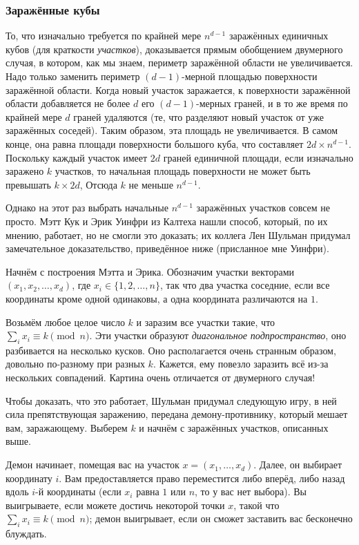 \subsubsection*{Заражённые кубы}

То, что изначально требуется по крайней мере $n^{d-1}$ заражённых единичных кубов (для краткости \emph{участков}), доказывается прямым обобщением двумерного случая, в котором, как мы знаем, периметр заражённой области не увеличивается.
Надо только заменить периметр $(d-1)$-мерной площадью поверхности заражённой области.
Когда новый участок заражается, к поверхности заражённой области добавляется не более $d$ его $(d-1)$-мерных граней,
и в то же время по крайней мере $d$ граней удаляются (те, что разделяют новый участок от уже заражённых соседей).
Таким образом, эта площадь не увеличивается.
В самом конце, она равна площади поверхности большого куба, что составляет $2d \times n^{d-1}$.
Поскольку каждый участок имеет $2d$ граней единичной площади,
если изначально заражено $k$ участков, то начальная площадь поверхности не может быть превышать $k \times 2d$, 
Отсюда $k$ не меньше $n^{d-1}$.

Однако на этот раз выбрать начальные $n^{d-1}$ заражённых участков совсем не просто.
Мэтт Кук и Эрик Уинфри из Калтеха нашли способ, который, по их мнению, работает, но не смогли это доказать;
их коллега Лен Шульман придумал замечательное доказательство, приведённое ниже (присланное мне Уинфри).

Начнём с построения Мэтта и Эрика.
Обозначим участки векторами $(x_1 , x_2 , \dots , x_d )$, где $x_i \in \{1, 2, \dots , n\}$, так что два участка соседние, 
если все координаты кроме одной одинаковы, а одна координата различаются на $1$.

Возьмём любое целое число $k$ и заразим все участки такие, что $\sum_i x_i \equiv k\pmod n$.
Эти участки образуют \emph{диагональное подпространство}, оно разбивается на несколько кусков.
Оно располагается очень странным образом, довольно по-разному при разных $k$.
Кажется, ему повезло заразить всё из-за нескольких совпадений.
Картина очень отличается от двумерного случая!

Чтобы доказать, что это работает, Шульман придумал следующую игру,
в ней сила препятствующая заражению, передана демону-противнику, который мешает вам, заражающему.
Выберем $k$ и начнём с заражённых участков, описанных выше.

Демон начинает, помещая вас на участок $x = (x_1, \dots,x_d )$.
Далее, он выбирает координату $i$.
Вам предоставляется право переместится либо вперёд, либо назад вдоль $i$-й координаты (если $x_i$ равна $1$ или $n$, то у вас нет выбора).
Вы выигрываете, если можете достичь некоторой точки $x$, такой что $\sum_i x_i \equiv k\pmod n$;
демон выигрывает, если он сможет заставить вас бесконечно блуждать.


